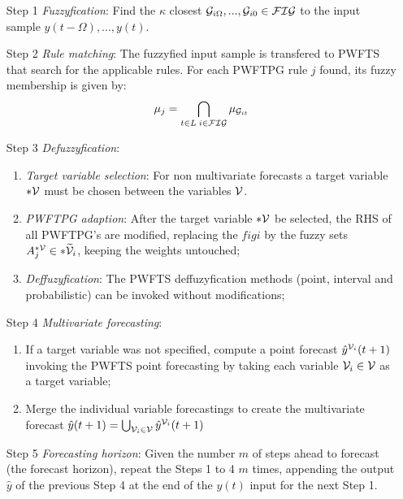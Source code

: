 \begin{enumerate}
\item [Step 1] \textit{Fuzzyfication}: Find the $\kappa$ closest   $\mathcal{G}_{i\Omega},...,\mathcal{G}_{i0} \in \mathcal{FIG}$ to the input sample $y(t-\Omega),...,y(t)$. 

\item [Step 2] \textit{Rule matching}: The fuzzyfied input sample is transfered to PWFTS that search for the applicable rules. For each PWFTPG rule $j$ found, its fuzzy membership is given by:
\begin{equation}
    \mu_j = \bigcap_{t\in L\; i \in \mathcal{FIG}} \mu_{\mathcal{G}_{it}}
\end{equation}

\item [Step 3] \textit{Defuzzyfication}: 
\begin{enumerate}
    \item \textit{Target variable selection}: For non multivariate forecasts a target variable $*\mathcal{V}$ must be chosen between the variables $\mathcal{V}$.
    \item \textit{PWFTPG adaption}: After the target variable $*\mathcal{V}$ be selected, the RHS of all PWFTPG's are modified, replacing the $figi$ by the fuzzy sets $A_j^{*\mathcal{V}} \in *\widetilde{\mathcal{V}}_i$, keeping the weights untouched;
    \item \textit{Deffuzyfication}: The PWFTS deffuzyfication methods (point, interval and probabilistic) can be invoked without modifications;
\end{enumerate}

\item [Step 4] \textit{Multivariate forecasting}:
\begin{enumerate}
    \item If a target variable was not specified, compute a point forecast $\hat{y}^{\mathcal{V}_i}(t+1)$ invoking the PWFTS point forecasting by taking each variable $\mathcal{V}_i \in \mathcal{V}$ as a target variable;
    \item Merge the individual variable forecastings to create the multivariate forecast $\hat{y}(t+1) = \bigcup_{\mathcal{V}_i \in \mathcal{V}} \hat{y}^{\mathcal{V}_i}(t+1)$ 
\end{enumerate}
 
\item [Step 5] \textit{Forecasting horizon}: Given the number $m$ of steps ahead to forecast  (the forecast horizon), repeat the Steps 1 to 4 $m$ times, appending the output $\hat{y}$ of the previous Step 4 at the end of the $y(t)$ input for the next Step 1.
\end{enumerate}

